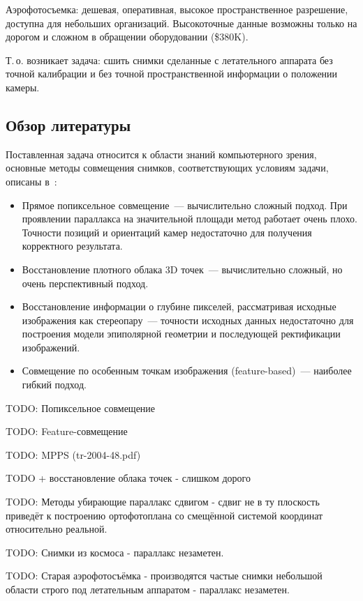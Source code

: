 \documentclass[a4paper,10pt]{article}
\begin{document}
Аэрофотосъемка: 
   дешевая, 
   оперативная, 
   высокое пространственное разрешение, 
   доступна для небольших организаций. 
Высокоточные данные возможны только на дорогом и сложном в обращении 
   оборудовании (\$380K).

Т.\,о. возникает задача: сшить снимки сделанные с летательного аппарата без 
точной калибрации и без точной пространственной информации о положении 
камеры.

\subsection{Обзор литературы}
Поставленная задача относится к области знаний компьютерного зрения, 
основные методы совмещения снимков, соответствующих условиям задачи, описаны 
в~\cite{szelisky06alignstichtut, szelisky10compvis}:
\begin{itemize}
  \item Прямое попиксельное совмещение~--- вычислительно сложный подход. 
  При проявлении параллакса на значительной площади метод работает очень плохо.
  Точности позиций и ориентаций камер недостаточно для получения корректного результата.
  \item Восстановление плотного облака 3D точек~--- вычислительно сложный, но очень перспективный подход.
  \item Восстановление информации о глубине пикселей, рассматривая исходные изображения как стереопару~--- 
  точности исходных данных недостаточно для построения модели эпиполярной геометрии и последующей ректификации изображений.
  \item Совмещение по особенным точкам изображения (feature-based)~--- наиболее гибкий подход.
\end{itemize}


TODO: Попиксельное совмещение

TODO: Feature-совмещение

TODO: MPPS (tr-2004-48.pdf)

TODO + восстановление облака точек - слишком дорого

TODO: Методы убирающие параллакс сдвигом - сдвиг не в ту плоскость приведёт
к построению ортофотоплана со смещённой системой координат относительно 
реальной.

TODO: Снимки из космоса - параллакс незаметен.

TODO: Старая аэрофотосъёмка - производятся частые снимки небольшой области строго
под летательным аппаратом - параллакс незаметен.
\end{document}

